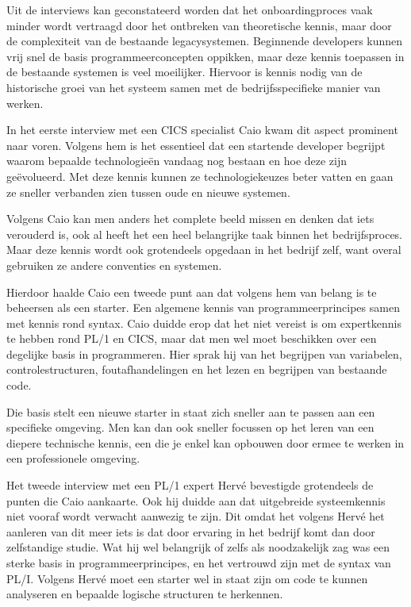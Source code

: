 Uit de interviews kan geconstateerd worden dat het onboardingproces vaak minder wordt vertraagd door het ontbreken van theoretische kennis,
maar door de complexiteit van de bestaande legacysystemen.
Beginnende developers kunnen vrij snel de basis programmeerconcepten oppikken, maar deze kennis toepassen in de bestaande systemen is veel moeilijker.
Hiervoor is kennis nodig van de historische groei van het systeem samen met de bedrijfsspecifieke manier van werken.

In het eerste interview met een CICS specialist Caio kwam dit aspect prominent naar voren.
Volgens hem is het essentieel dat een startende developer begrijpt waarom bepaalde technologieën vandaag nog bestaan en hoe deze zijn geëvolueerd.
Met deze kennis kunnen ze technologiekeuzes beter vatten en gaan ze sneller verbanden zien tussen oude en nieuwe systemen.

Volgens Caio kan men anders het complete beeld missen en denken dat iets verouderd is, ook al heeft het een heel belangrijke taak binnen het bedrijfsproces.
Maar deze kennis wordt ook grotendeels opgedaan in het bedrijf zelf, want overal gebruiken ze andere conventies en systemen.

Hierdoor haalde Caio een tweede punt aan dat volgens hem van belang is te beheersen als een starter.
Een algemene kennis van programmeerprincipes samen met kennis rond syntax.
Caio duidde erop dat het niet vereist is om expertkennis te hebben rond PL/1 en CICS,
maar dat men wel moet beschikken over een degelijke basis in programmeren.
Hier sprak hij van het begrijpen van variabelen, controlestructuren, foutafhandelingen en het lezen en begrijpen van bestaande code.

Die basis stelt een nieuwe starter in staat zich sneller aan te passen aan een specifieke omgeving.
Men kan dan ook sneller focussen op het leren van een diepere technische kennis, een die je enkel kan opbouwen door ermee te werken in een professionele omgeving.

Het tweede interview met een PL/1 expert Hervé bevestigde grotendeels de punten die Caio aankaarte.
Ook hij duidde aan dat uitgebreide systeemkennis niet vooraf wordt verwacht aanwezig te zijn.
Dit omdat het volgens Hervé het aanleren van dit meer iets is dat door ervaring in het bedrijf komt dan door zelfstandige studie.
Wat hij wel belangrijk of zelfs als noodzakelijk zag was een sterke basis in programmeerprincipes, en het vertrouwd zijn met de syntax van PL/I.
Volgens Hervé moet een starter wel in staat zijn om code te kunnen analyseren en bepaalde logische structuren te herkennen.

